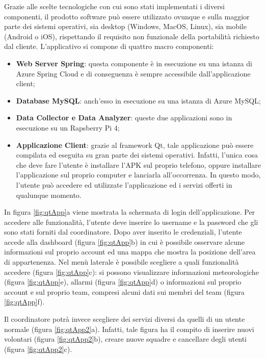 
Grazie alle scelte tecnologiche con cui sono stati implementati i diversi componenti, il prodotto software può essere utilizzato ovunque e sulla maggior parte dei sistemi operativi, sia desktop (Windows, MacOS, Linux), sia mobile (Android o iOS), rispettando il requisito non funzionale della portabilità richiesto dal cliente.
L'applicativo si compone di quattro macro componenti:
\begin{itemize}
	\item \textbf{Web Server Spring}: questa componente è in esecuzione su una istanza di Azure Spring Cloud e di conseguenza è sempre accessibile dall'applicazione client;
	\item \textbf{Database MySQL}: anch'esso in esecuzione su una istanza di Azure MySQL;
	\item \textbf{Data Collector e Data Analyzer}: queste due applicazioni sono in esecuzione su un Rapsberry Pi 4;
	\item \textbf{Applicazione Client}: grazie al framework Qt, tale applicazione può essere compilata ed eseguita su gran parte dei sistemi operativi. Infatti, l'unica cosa che deve fare l'utente è installare l'APK sul proprio telefono, oppure installare l'applicazione sul proprio computer e lanciarla all'occorrenza. In questo modo, l'utente può accedere ed utilizzate l'applicazione ed i servizi offerti in qualunque momento. 
\end{itemize}

In figura \ref{fig:qtApp}a viene mostrata la schermata di login dell'applicazione. Per accedere alle funzionalità, l'utente deve inserire lo username e la password che gli sono stati forniti dal coordinatore. 
Dopo aver inserito le credenziali, l'utente accede alla dashboard (figura \ref{fig:qtApp}b) in cui è possibile osservare alcune informazioni sul proprio account ed una mappa che mostra la posizione dell'area di appartenenza.
Nel menù laterale è possibile scegliere a quali funzionalità accedere (figura \ref{fig:qtApp}c): si possono visualizzare informazioni meteorologiche (figura \ref{fig:qtApp}e), allarmi (figura \ref{fig:qtApp}d) o informazioni sul proprio account e sul proprio team, compresi alcuni dati sui membri del team (figura \ref{fig:qtApp}f).

Il coordinatore potrà invece scegliere dei servizi diversi da quelli di un utente normale (figura \ref{fig:qtApp2}a). Infatti, tale figura ha il compito di inserire nuovi volontari (figura \ref{fig:qtApp2}b), creare nuove squadre e cancellare degli utenti (figura \ref{fig:qtApp2}c).

